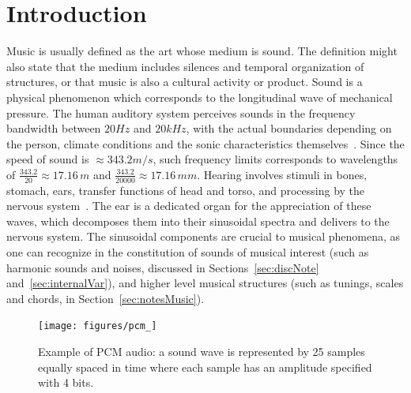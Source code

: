 \section{Introduction}\label{sec:level1}
Music is usually defined as the art whose medium is sound.
The definition might also state that the medium includes silences
and temporal organization of structures, or that music
is also a cultural activity or product.
Sound is a physical phenomenon which corresponds to the longitudinal wave of mechanical pressure.
The human auditory system perceives sounds in the frequency bandwidth between $20Hz$ and $20kHz$,
with the actual boundaries depending on the person,
climate conditions and the sonic characteristics themselves~\cite{Roederer}.
Since the speed of sound is $\approx 343.2 m/s$,
such frequency limits corresponds to  wavelengths of $\frac{343.2}{20} \approx 17.16\,m$ and
$\frac{343.2}{20000} \approx 17.16\,mm$.
Hearing involves stimuli in bones, stomach, ears,
transfer functions of head and torso,
and processing by the nervous system~\cite{Roederer}.
The ear is a dedicated organ for the appreciation of these waves,
which decomposes them into their sinusoidal spectra and delivers to the nervous system.
The sinusoidal components are crucial to musical phenomena,
as one can recognize in the constitution of sounds of musical interest
(such as harmonic sounds and noises, discussed in Sections~\ref{sec:discNote} and~\ref{sec:internalVar}),
and higher level musical structures (such as tunings, scales and chords, in Section~\ref{sec:notesMusic}).

\begin{figure}[!h]
    \centering
        \texttt{[image: figures/pcm\_]}
	\caption{Example of PCM audio:
	a sound wave is represented by 25 samples equally spaced in time where each sample has an amplitude specified with 4 bits.}
        \label{fig:PCM}
\end{figure}

